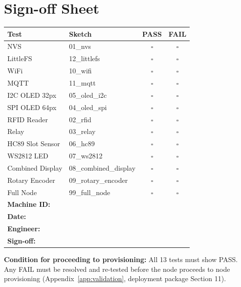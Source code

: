 \section{Sign-off Sheet}

\begin{center}
\begin{tabular}{|l|l|c|c|}
\hline
\textbf{Test} & \textbf{Sketch} & \textbf{PASS} & \textbf{FAIL} \\
\hline
NVS              & 01\_nvs             & $\square$ & $\square$ \\
LittleFS         & 12\_littlefs        & $\square$ & $\square$ \\
WiFi             & 10\_wifi            & $\square$ & $\square$ \\
MQTT             & 11\_mqtt            & $\square$ & $\square$ \\
I2C OLED 32px    & 05\_oled\_i2c       & $\square$ & $\square$ \\
SPI OLED 64px    & 04\_oled\_spi       & $\square$ & $\square$ \\
RFID Reader      & 02\_rfid            & $\square$ & $\square$ \\
Relay            & 03\_relay           & $\square$ & $\square$ \\
HC89 Slot Sensor & 06\_hc89            & $\square$ & $\square$ \\
WS2812 LED       & 07\_ws2812          & $\square$ & $\square$ \\
Combined Display & 08\_combined\_display & $\square$ & $\square$ \\
Rotary Encoder   & 09\_rotary\_encoder  & $\square$ & $\square$ \\
Full Node        & 99\_full\_node       & $\square$ & $\square$ \\
\hline
\multicolumn{2}{|l|}{\textbf{Machine ID:}} & \multicolumn{2}{c|}{} \\
\hline
\multicolumn{2}{|l|}{\textbf{Date:}} & \multicolumn{2}{c|}{} \\
\hline
\multicolumn{2}{|l|}{\textbf{Engineer:}} & \multicolumn{2}{c|}{} \\
\hline
\multicolumn{2}{|l|}{\textbf{Sign-off:}} & \multicolumn{2}{c|}{} \\
\hline
\end{tabular}
\end{center}

\vspace{1em}
\textbf{Condition for proceeding to provisioning:} All 13 tests must show PASS. Any FAIL must be resolved and re-tested before the node proceeds to node provisioning (Appendix~\ref{app:validation}, deployment package Section 11).

